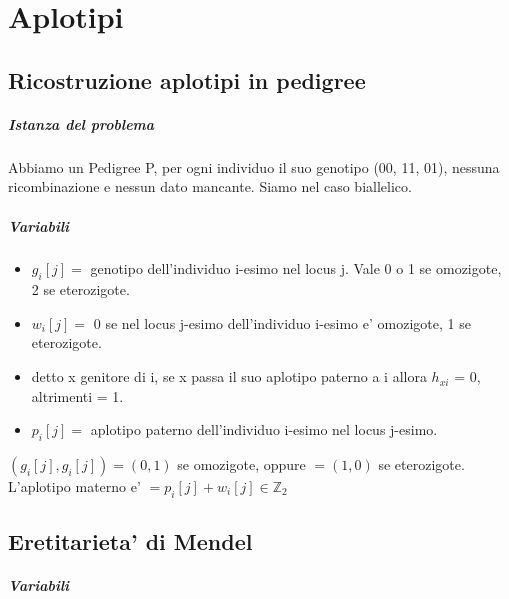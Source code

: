 \chapter{Aplotipi}

\section{Ricostruzione aplotipi in pedigree}

\paragraph{Istanza del problema}

Abbiamo un Pedigree P, per ogni individuo il suo genotipo (00, 11, 01), nessuna ricombinazione e nessun dato mancante. Siamo nel caso biallelico.

\paragraph{Variabili}

\begin{itemize}
    \item $g_i[j] = $ genotipo dell'individuo i-esimo nel locus j. Vale 0 o 1 se omozigote, 2 se eterozigote.
    \item $w_i[j] = $ 0 se nel locus j-esimo dell'individuo i-esimo e' omozigote, 1 se eterozigote.
    \item detto x genitore di i, se x passa il suo aplotipo paterno a i allora $h_{xi}$ = 0, altrimenti = 1.
    \item $p_i[j] = $ aplotipo paterno dell'individuo i-esimo nel locus j-esimo.
\end{itemize}

$(g_i[j], g_i[j]) = (0, 1)$ se omozigote, oppure $= (1,0)$ se eterozigote. L'aplotipo materno e' $= p_i[j] + w_i[j] \in \mathbb{Z}_2$

\section{Eretitarieta' di Mendel}

\paragraph{Variabili}

